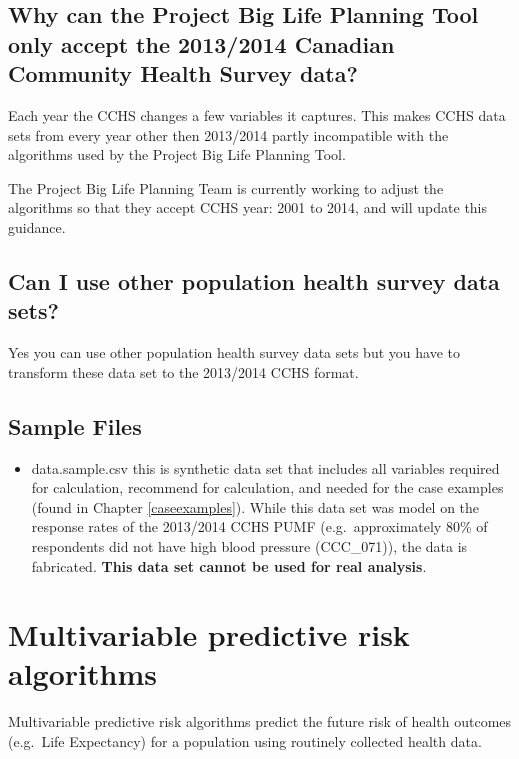 \documentclass[]{book}
\providecommand{\tightlist}{%
  \setlength{\itemsep}{0pt}\setlength{\parskip}{0pt}}
\begin{document}
\subsection{Why can the Project Big Life Planning Tool only accept the
2013/2014 Canadian Community Health Survey
data?}\label{why-can-the-project-big-life-planning-tool-only-accept-the-20132014-canadian-community-health-survey-data}

Each year the CCHS changes a few variables it captures. This makes CCHS
data sets from every year other then 2013/2014 partly incompatible with
the algorithms used by the Project Big Life Planning Tool.

The Project Big Life Planning Team is currently working to adjust the
algorithms so that they accept CCHS year: 2001 to 2014, and will update
this guidance.

\subsection{Can I use other population health survey data
sets?}\label{can-i-use-other-population-health-survey-data-sets}

Yes you can use other population health survey data sets but you have to
transform these data set to the 2013/2014 CCHS format.

\subsection{Sample Files}\label{sample-files}

\begin{itemize}
\tightlist
\item
  data.sample.csv this is synthetic data set that includes all variables
  required for calculation, recommend for calculation, and needed for
  the case examples (found in Chapter \ref{caseexamples}). While this
  data set was model on the response rates of the 2013/2014 CCHS PUMF
  (e.g.~approximately 80\% of respondents did not have high blood
  pressure (CCC\_071)), the data is fabricated. \textbf{This data set
  cannot be used for real analysis}.
\end{itemize}

\section{Multivariable predictive risk
algorithms}\label{multivariable-predictive-risk-algorithms}

Multivariable predictive risk algorithms predict the future risk of
health outcomes (e.g.~Life Expectancy) for a population using routinely
collected health data.
\end{document}
